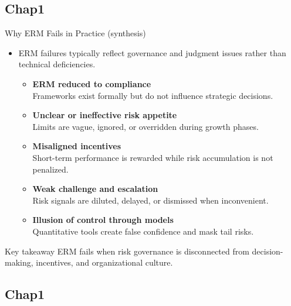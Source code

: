 \documentclass[aspectratio=169, 10pt]{beamer} %
\begin{document}
\subsection{Chap1}
\begin{frame}{Why ERM Fails in Practice (synthesis)}
\begin{itemize}
 \item[$\bullet$] ERM failures typically reflect governance and judgment issues rather than
technical deficiencies.

\medskip

\begin{itemize}
    \item[$\bullet$] \textbf{ERM reduced to compliance} \\
    Frameworks exist formally but do not influence strategic decisions.

    \item[$\bullet$] \textbf{Unclear or ineffective risk appetite} \\
    Limits are vague, ignored, or overridden during growth phases.

    \item[$\bullet$] \textbf{Misaligned incentives} \\
    Short-term performance is rewarded while risk accumulation is not penalized.

    \item[$\bullet$] \textbf{Weak challenge and escalation} \\
    Risk signals are diluted, delayed, or dismissed when inconvenient.

    \item[$\bullet$] \textbf{Illusion of control through models} \\
    Quantitative tools create false confidence and mask tail risks.
\end{itemize}
\end{itemize}

\begin{block}{Key takeaway}
ERM fails when risk governance is disconnected from decision-making,
incentives, and organizational culture.
\end{block}

\end{frame}

\subsection{Chap1}
\begin{frame}{}

\centering
\color{blue} 

\end{frame}
\end{document}
